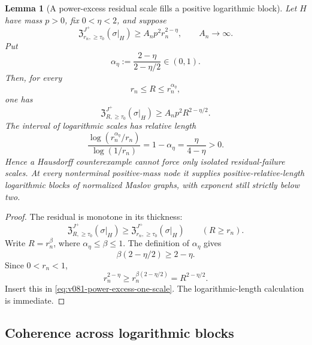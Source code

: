 \documentclass[10pt]{article}
\newtheorem{lemma}[theorem]{Lemma}
\begin{document}
\begin{lemma}[A power-excess residual scale fills a positive logarithmic block]
\label{lem:v081-power-excess-logarithmic-block}
Let \(H\) have mass \(p>0\), fix \(0<\eta<2\), and suppose
\begin{equation}
\label{eq:v081-power-excess-one-scale}
\mathfrak Z_{r_n,\ge\tau_0}^{J^+}(\sigma|_H)
\ge
A_np^2r_n^{2-\eta},
\qquad
A_n\longrightarrow\infty.
\end{equation}
Put
\[
\alpha_\eta
:=
\frac{2-\eta}{2-\eta/2}
\in(0,1).
\]
Then, for every
\[
r_n\le R\le r_n^{\alpha_\eta},
\]
one has
\begin{equation}
\label{eq:v081-power-excess-block}
\boxed{
\mathfrak Z_{R,\ge\tau_0}^{J^+}(\sigma|_H)
\ge
A_np^2R^{2-\eta/2}.
}
\end{equation}
The interval of logarithmic scales has relative length
\begin{equation}
\label{eq:v081-power-excess-log-density}
\boxed{
\frac{\log(r_n^{\alpha_\eta}/r_n)}
{\log(1/r_n)}
=
1-\alpha_\eta
=
\frac{\eta}{4-\eta}>0.
}
\end{equation}
Hence a Hausdorff counterexample cannot force only isolated residual-failure scales.  At every
nonterminal positive-mass node it supplies positive-relative-length logarithmic blocks of
normalized Maslov graphs, with exponent still strictly below two.
\end{lemma}

\begin{proof}
The residual is monotone in its thickness:
\[
\mathfrak Z_{R,\ge\tau_0}^{J^+}(\sigma|_H)
\ge
\mathfrak Z_{r_n,\ge\tau_0}^{J^+}(\sigma|_H)
\qquad(R\ge r_n).
\]
Write \(R=r_n^\beta\), where
\(\alpha_\eta\le\beta\le1\).  The definition of \(\alpha_\eta\) gives
\[
\beta(2-\eta/2)\ge2-\eta.
\]
Since \(0<r_n<1\),
\[
r_n^{2-\eta}
\ge
r_n^{\beta(2-\eta/2)}
=
R^{2-\eta/2}.
\]
Insert this in \eqref{eq:v081-power-excess-one-scale}.  The logarithmic-length calculation is
immediate.
\end{proof}

\subsection{Coherence across logarithmic blocks}
\end{document}
